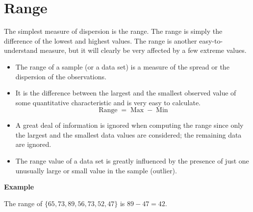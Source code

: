 \documentclass[a4paper,12pt]{article}
\begin{document}
	\section*{Range}


\noindent The simplest measure of dispersion is the range.
The range is simply the difference of the lowest and highest values. The range is
another easy-to-understand measure, but it will clearly be very affected by a few
extreme values.	
	\begin{itemize}
		\item The range of a sample (or a data set) is a measure of the spread or the dispersion of the observations. \item It is the difference between the largest and the smallest observed value of some quantitative characteristic and is very easy to calculate.
		\[ \operatorname{Range} = \operatorname{Max} -\operatorname{Min} \]
		
		
		\item A great deal of information is ignored when computing the range since only the largest and the smallest data values are considered; the remaining data are ignored.
		
		\item The range value of a data set is greatly influenced by the presence of just one unusually large or small value in the sample (outlier).
	\end{itemize}
	
	\noindent \textbf{Example}
	
	
	The range of $\{65,73,89,56,73,52,47\}$ is $ 89-47 = 42$.
	
	
\end{document}
